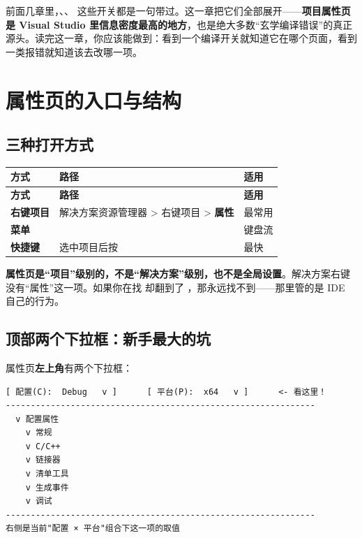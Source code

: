 
前面几章里，、、 这些开关都是一句带过。这一章把它们全部展开——\textbf{项目属性页是 Visual Studio 里信息密度最高的地方}，也是绝大多数“玄学编译错误”的真正源头。读完这一章，你应该能做到：看到一个编译开关就知道它在哪个页面，看到一类报错就知道该去改哪一项。

\section{属性页的入口与结构}

\subsection{三种打开方式}

\begin{longtable}{L{2.4cm}L{9.6cm}L{2.4cm}}
\toprule
\textbf{方式} & \textbf{路径} & \textbf{适用} \\
\midrule
\endfirsthead
\toprule
\textbf{方式} & \textbf{路径} & \textbf{适用} \\
\midrule
\endhead
\bottomrule
\endlastfoot
\textbf{右键项目} & 解决方案资源管理器 > 右键项目 > \textbf{属性} & 最常用 \\
\textbf{菜单} &  & 键盘流 \\
\textbf{快捷键} & 选中项目后按  & 最快 \\
\end{longtable}

\begin{warnbox}[注意]
\textbf{属性页是“项目”级别的，不是“解决方案”级别，也不是全局设置}。解决方案右键没有“属性”这一项。如果你在找  却翻到了 ，那永远找不到——那里管的是 IDE 自己的行为。
\end{warnbox}

\subsection{顶部两个下拉框：新手最大的坑}

属性页\textbf{左上角}有两个下拉框：

\begin{lstlisting}[style=textstyle, breaklines=true]
[ 配置(C):  Debug   v ]      [ 平台(P):  x64   v ]      <- 看这里！
--------------------------------------------------------------
  v 配置属性
    v 常规
    v C/C++
    v 链接器
    v 清单工具
    v 生成事件
    v 调试
--------------------------------------------------------------
右侧是当前"配置 × 平台"组合下这一项的取值
\end{lstlisting}

